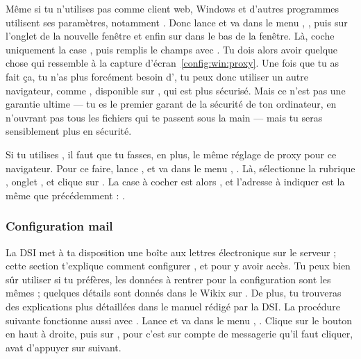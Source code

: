 Même si tu n'utilises pas  comme client web, Windows et d'autres programmes
utilisent ses paramètres, notamment . Donc lance  et va
dans le menu , , puis sur l'onglet  de la
nouvelle fenêtre et enfin sur  dans le bas de la fenêtre. Là, coche
uniquement la case , puis remplis le champs
 avec . Tu dois alors avoir quelque chose qui
ressemble à la capture d'écran~\ref{config:win:proxy}.
\setcounter{page}{33}
Une fois que tu as fait \c{c}a, tu n'as plus forcément besoin d', tu peux donc utiliser un autre navigateur, comme , disponible sur \xshare, qui est plus sécurisé. Mais ce n'est pas une garantie ultime --- tu es le premier garant de la sécurité de ton
ordinateur, en n'ouvrant pas tous les fichiers qui te passent sous la main
--- mais tu seras sensiblement plus en sécurité.


Si tu utilises , il faut que tu fasses, en plus, le même réglage de proxy pour
ce navigateur. Pour ce faire, lance , et va dans le menu ,
. Là, sélectionne la rubrique , onglet , et clique sur
. La case à cocher est alors ,
et l'adresse à indiquer est la même que précédemment : .





\subsubsection{Configuration mail}

La DSI met à ta disposition une bo\^{i}te aux lettres électronique sur
le serveur  ; cette section t'explique comment
configurer , et  pour y avoir accès. Tu peux bien
s\^{u}r utiliser  si tu préfères, les données à rentrer
pour la configuration sont les mêmes ; quelques détails sont donnés
dans le Wikix sur \fkz. De plus, tu trouveras des explications plus
détaillées dans le manuel rédigé par la DSI.
La procédure suivante fonctionne aussi avec .
Lance  et va dans le menu ,
. Clique sur le bouton  en
haut à droite, puis sur , pour  c'est sur compte de messagerie qu'il faut cliquer, avat d'appuyer sur suivant.

